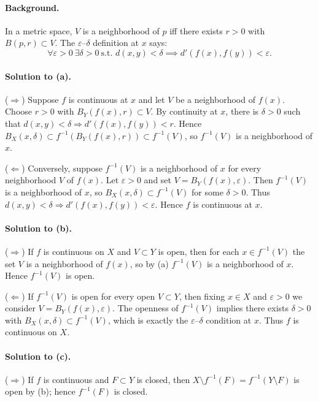 \documentclass[12pt,a4paper]{article}
\begin{document}
\paragraph{Background.}
In a metric space, $V$ is a neighborhood of $p$ iff there exists $r>0$ with $B(p,r)\subset V$.
The $\varepsilon$--$\delta$ definition at $x$ says:
\[
\forall\varepsilon>0\ \exists\delta>0\ \text{s.t. } d(x,y)<\delta \implies d'(f(x),f(y))<\varepsilon.
\]

\paragraph{Solution to (a).}
($\Rightarrow$) Suppose $f$ is continuous at $x$ and let $V$ be a neighborhood of $f(x)$. Choose $r>0$ with $B_Y(f(x),r)\subset V$. By continuity at $x$, there is $\delta>0$ such that $d(x,y)<\delta\Rightarrow d'(f(x),f(y))<r$. Hence $B_X(x,\delta)\subset f^{-1}(B_Y(f(x),r))\subset f^{-1}(V)$, so $f^{-1}(V)$ is a neighborhood of $x$.

($\Leftarrow$) Conversely, suppose $f^{-1}(V)$ is a neighborhood of $x$ for every neighborhood $V$ of $f(x)$. Let $\varepsilon>0$ and set $V=B_Y(f(x),\varepsilon)$. Then $f^{-1}(V)$ is a neighborhood of $x$, so $B_X(x,\delta)\subset f^{-1}(V)$ for some $\delta>0$. Thus $d(x,y)<\delta\Rightarrow d'(f(x),f(y))<\varepsilon$. Hence $f$ is continuous at $x$.

\paragraph{Solution to (b).}
($\Rightarrow$) If $f$ is continuous on $X$ and $V\subset Y$ is open, then for each $x\in f^{-1}(V)$ the set $V$ is a neighborhood of $f(x)$, so by (a) $f^{-1}(V)$ is a neighborhood of $x$. Hence $f^{-1}(V)$ is open.

($\Leftarrow$) If $f^{-1}(V)$ is open for every open $V\subset Y$, then fixing $x\in X$ and $\varepsilon>0$ we consider $V=B_Y(f(x),\varepsilon)$. The openness of $f^{-1}(V)$ implies there exists $\delta>0$ with $B_X(x,\delta)\subset f^{-1}(V)$, which is exactly the $\varepsilon$--$\delta$ condition at $x$. Thus $f$ is continuous on $X$.

\paragraph{Solution to (c).}
($\Rightarrow$) If $f$ is continuous and $F\subset Y$ is closed, then $X\setminus f^{-1}(F)=f^{-1}(Y\setminus F)$ is open by (b); hence $f^{-1}(F)$ is closed.
\end{document}
